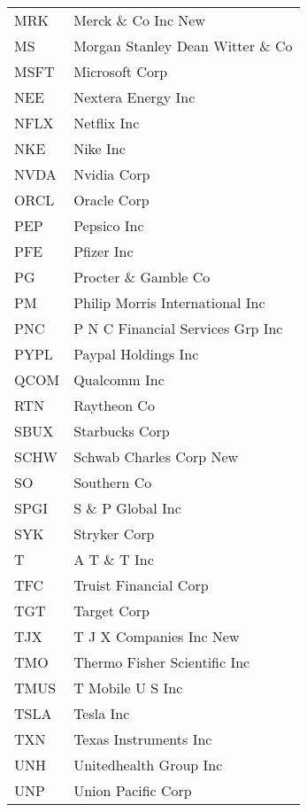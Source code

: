 \begin{tabular}{ll}
MRK    &               Merck \& Co Inc New \\
MS     &  Morgan Stanley Dean Witter \& Co \\
MSFT   &                    Microsoft Corp \\
NEE    &                Nextera Energy Inc \\
NFLX   &                       Netflix Inc \\
NKE    &                          Nike Inc \\
NVDA   &                       Nvidia Corp \\
ORCL   &                       Oracle Corp \\
PEP    &                       Pepsico Inc \\
PFE    &                        Pfizer Inc \\
PG     &              Procter \& Gamble Co \\
PM     &   Philip Morris International Inc \\
PNC    &  P N C Financial Services Grp Inc \\
PYPL   &               Paypal Holdings Inc \\
QCOM   &                      Qualcomm Inc \\
RTN    &                       Raytheon Co \\
SBUX   &                    Starbucks Corp \\
SCHW   &           Schwab Charles Corp New \\
SO     &                       Southern Co \\
SPGI   &                 S \& P Global Inc \\
SYK    &                      Stryker Corp \\
T      &                      A T \& T Inc \\
TFC    &             Truist Financial Corp \\
TGT    &                       Target Corp \\
TJX    &           T J X Companies Inc New \\
TMO    &      Thermo Fisher Scientific Inc \\
TMUS   &                  T Mobile U S Inc \\
TSLA   &                         Tesla Inc \\
TXN    &             Texas Instruments Inc \\
UNH    &            Unitedhealth Group Inc \\
UNP    &                Union Pacific Corp \\

\end{tabular}
